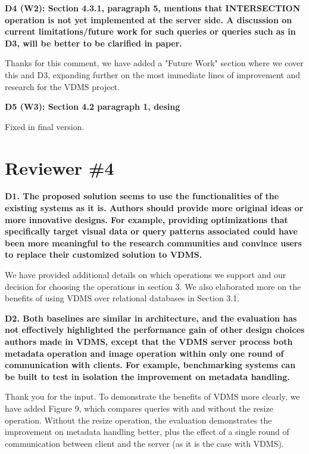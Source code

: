 \documentclass[11pt]{proposalnsf}
\begin{document}
\bigskip
\noindent %
\textbf{
D4 (W2): Section 4.3.1, paragraph 5, mentions that INTERSECTION operation is not
yet implemented at the server side.
A discussion on current limitations/future work for such queries or queries
such as in D3, will be better to be clarified in paper.
}\bigskip

Thanks for this comment, we have added a "Future Work" section where we cover
this and D3, expanding further on the most immediate lines of
improvement and research for the VDMS project.

\bigskip
\noindent %
\textbf{
D5 (W3): Section 4.2 paragraph 1, desing
}\bigskip

Fixed in final version.

\bigskip

\newpage
\section{Reviewer \#4}

\noindent %
\textbf{
D1. The proposed solution seems to use the functionalities of the existing systems
as it is. Authors should provide more original ideas or more innovative designs.
For example, providing optimizations that specifically target visual data or query
patterns associated could have been more meaningful to the research communities and
convince users to replace their customized solution to VDMS.
}\bigskip

We have provided additional details on which operations we support and our
decision for choosing the operations in section 3.
We also elaborated more on the benefits of
using VDMS over relational databases in Section 3.1.

\bigskip
\noindent %
\textbf{
D2. Both baselines are similar in architecture, and the evaluation has not effectively
highlighted the performance gain of other design choices authors made in VDMS,
except that the VDMS server process both metadata operation and image operation
within only one round of communication with clients.
For example, benchmarking systems can be built to test in isolation the
improvement on metadata handling.
}\bigskip

Thank you for the input. To demonstrate the benefits of VDMS more clearly,
we have added Figure 9, which compares queries with and without the resize operation.
Without the resize operation, the evaluation demonstrates the
improvement on metadata handling better, plus the effect of a single round
of communication between client and the server (as it is the case with VDMS).
\end{document}
